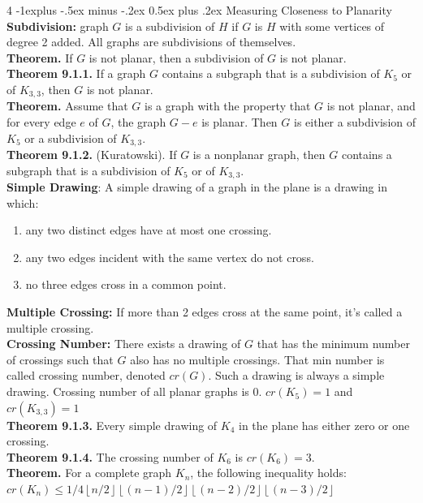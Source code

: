 \documentclass[letterpaper, 8pt]{extarticle}
\makeatletter
\renewcommand{\section}{\@startsection{section}{1}{0mm}%
	{-1explus -.5ex minus -.2ex}%
	{0.5ex plus .2ex}%
	{\normalfont\normalsize\bfseries}}
\makeatother
\begin{document}
\begin{multicols*}{4}
	\section{Measuring Closeness to Planarity}
	\textbf{Subdivision:} graph $G$ is a subdivision of $H$ if $G$ is $H$ with some vertices of degree 2 added. All graphs are subdivisions of themselves. \\
	\textbf{Theorem.} If $G$ is not planar, then a subdivision of $G$ is not planar. \\
	\textbf{Theorem 9.1.1.} If a graph $G$ contains a subgraph that is a subdivision of $K_{5}$ or of $K_{3,3}$, then $G$ is not planar. \\
	\textbf{Theorem.} Assume that $G$ is a graph with the property that $G$ is not planar, and for every edge $e$ of $G$, the graph $G-e$ is planar. Then $G$ is either a subdivision of $K_{5}$ or a subdivision of $K_{3,3}$. \\
	\textbf{Theorem 9.1.2.} (Kuratowski). If $G$ is a nonplanar graph, then $G$ contains a subgraph that is a subdivision of $K_{5}$ or of $K_{3,3}$. \\
	\textbf{Simple Drawing}: A simple drawing of a graph in the plane is a drawing in which:
	\begin{enumerate}
		\item[a)] any two distinct edges have at most one crossing.
		\item[b)] any two edges incident with the same vertex do not cross.
		\item[c)] no three edges cross in a common point.
	\end{enumerate}
	\textbf{Multiple Crossing:} If more than 2 edges cross at the same point, it's called a multiple crossing. \\
	\textbf{Crossing Number:} There exists a drawing of $G$ that has the minimum number of crossings such that $G$ also has no multiple crossings. That min number is called crossing number, denoted $cr(G)$. Such a drawing is always a simple drawing. Crossing number of all planar graphs is 0. $cr(K_{5})=1$ and $cr(K_{3,3})=1$ \\
	\textbf{Theorem 9.1.3.} Every simple drawing of $K_{4}$ in the plane has either zero or one crossing. \\
	\textbf{Theorem 9.1.4.} The crossing number of $K_{6}$ is $cr(K_{6})=3$. \\
	\textbf{Theorem.} For a complete graph $K_{n}$, the following inequality holds: $cr(K_{n}) \le 1/4 \left\lfloor n/2\right\rfloor\left\lfloor (n-1)/2\right\rfloor \left\lfloor (n-2)/2\right\rfloor\left\lfloor (n-3)/2\right\rfloor$ \\

\end{multicols*}
\end{document}
